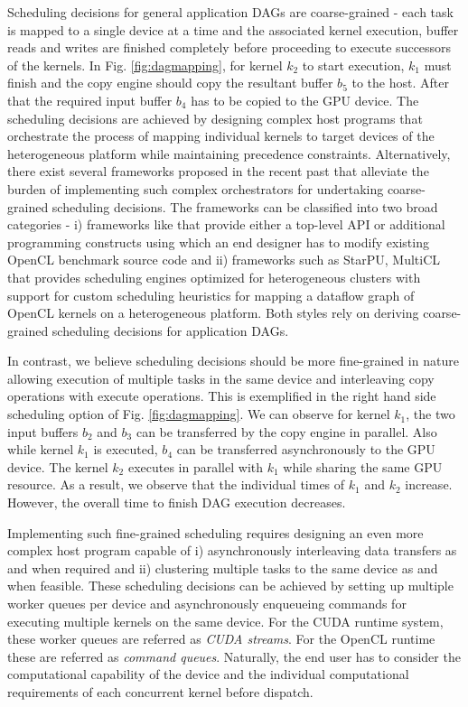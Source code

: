     Scheduling decisions for general application DAGs are coarse-grained - each task is mapped to a single device at a time and the associated kernel execution, buffer reads and writes are finished completely before proceeding to execute successors of the kernels. In Fig. \ref{fig:dagmapping}, for kernel $k_2$ to start execution, $k_1$ must finish and the copy engine should copy the resultant buffer $b_5$ to the host. After that the required input buffer $b_4$ has to be copied to the GPU device. The scheduling decisions are achieved by designing complex host programs that orchestrate the process of mapping individual kernels to target devices of the heterogeneous platform while maintaining precedence constraints. Alternatively, there exist several frameworks proposed in the recent past that alleviate the burden of implementing such complex orchestrators for undertaking coarse-grained scheduling decisions. The frameworks can be classified into two broad categories - i) frameworks like \cite{pekka,henry2014toward} that provide either a top-level API or additional programming constructs using which an end designer has to modify existing OpenCL benchmark source code and ii) frameworks such as StarPU, MultiCL that provides scheduling engines  \cite{augonnet2011starpu,multicl} optimized for heterogeneous clusters with support for custom scheduling heuristics for mapping a dataflow graph of OpenCL kernels on a heterogeneous platform. Both styles rely on deriving coarse-grained scheduling decisions for application DAGs. 

    In contrast, we believe scheduling decisions should be more fine-grained in nature allowing execution of multiple tasks in the same device and interleaving copy operations with execute operations. This is exemplified in the right hand side scheduling option of Fig. \ref{fig:dagmapping}. We can observe for kernel $k_1$, the two input buffers $b_2$ and $b_3$ can be transferred by the copy engine in parallel. Also while kernel $k_1$ is executed,  $b_4$ can be transferred asynchronously to the GPU device. The kernel $k_2$ executes in parallel with $k_1$ while sharing the same GPU resource. As a result, we observe that the individual times of $k_1$ and $k_2$ increase. However, the overall time to finish DAG execution decreases. 

    Implementing such fine-grained scheduling requires designing an even more complex host program capable of  i) asynchronously interleaving data transfers as and when required and ii) clustering multiple tasks to the same device as and when feasible. These scheduling decisions can be achieved by setting up multiple worker queues per device and asynchronously enqueueing commands for executing multiple kernels on the same device. For the CUDA runtime system, these worker queues are referred as {\em CUDA streams}.  For the OpenCL runtime these are referred as {\em command queues}. Naturally, the end user has to consider the computational capability of the device and the individual computational requirements of each concurrent kernel before dispatch. 

